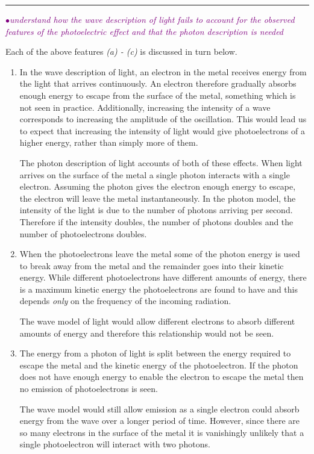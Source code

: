 \documentclass[a4paper,11pt,twoside]{memoir}
\newcounter{spec}[chapter]
\newcommand{\spec}[1]{\Needspace{5\baselineskip}\textcolor{purple}{$\bullet$\hspace{0.5cm}\textit{#1}}}
\begin{document}
\rule{\textwidth}{0.1pt}

\spec{understand how the wave description of light fails to account for the observed features of the photoelectric effect and that the photon description is needed}

Each of the above features \emph{(a) - (c)} is discussed in turn below.

\begin{enumerate}[label=\emph{(\alph*)}]

\item In the wave description of light, an electron in the metal receives energy from the light that arrives continuously. An electron therefore gradually absorbs enough energy to escape from the surface of the metal, something which is not seen in practice. Additionally, increasing the intensity of a wave corresponds to increasing the amplitude of the oscillation. This would lead us to expect that increasing the intensity of light would give photoelectrons of a higher energy, rather than simply more of them.

The photon description of light accounts of both of these effects. When light arrives on the surface of the metal a single photon interacts with a single electron. Assuming the photon gives the electron enough energy to escape, the electron will leave the metal instantaneously. In the photon model, the intensity of the light is due to the number of photons arriving per second. Therefore if the intensity doubles, the number of photons doubles and the number of photoelectrons doubles.

\item When the photoelectrons leave the metal some of the photon energy is used to break away from the metal and the remainder goes into their kinetic energy. While different photoelectrons have different amounts of energy, there is a maximum kinetic energy the photoelectrons are found to have and this depends \emph{only} on the frequency of the incoming radiation.

The wave model of light would allow different electrons to absorb different amounts of energy and therefore this relationship would not be seen.

\item The energy from a photon of light is split between the energy required to escape the metal and the kinetic energy of the photoelectron. If the photon does not have enough energy to enable the electron to escape the metal then no emission of photoelectrons is seen.

The wave model would still allow emission as a single electron could absorb energy from the wave over a longer period of time. However, since there are so many electrons in the surface of the metal it is vanishingly unlikely that a single photoelectron will interact with two photons.

\end{enumerate}
\end{document}
